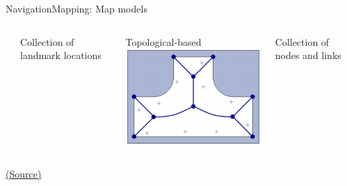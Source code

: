 \documentclass[10pt,compress]{beamer} %
\begin{document}
\begin{frame}{Navigation}{Mapping: Map models}
\begin{center}
\begin{columns}
\begin{center}
		\end{center}
		Collection of landmark locations
	   	\begin{center}Topological-based\\\bigskip
		\includegraphics[width=\linewidth]{figs/topological.png}\\
		\end{center}
		Collection of nodes and links
	\end{columns}
	\bigskip
	\tiny{\href{http://www.cs.cmu.edu/~motionplanning/lecture/Chap8-Kalman-Mapping_howie.pdf}{(Source)}}
	\end{center}
\end{frame}
\end{document}
